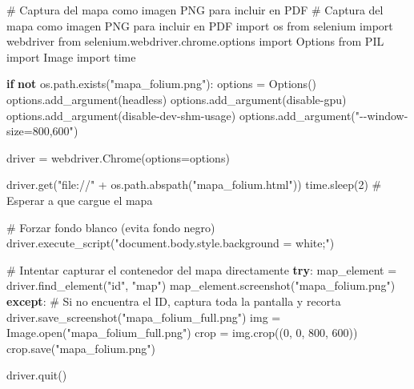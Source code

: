 \documentclass[
  letterpaper,
  DIV=11,
  numbers=noendperiod]{scrreprt}
\newenvironment{Shaded}{\begin{snugshade}}{\end{snugshade}}
\newcommand{\BuiltInTok}[1]{\textcolor[rgb]{0.00,0.23,0.31}{#1}}
\newcommand{\CommentTok}[1]{\textcolor[rgb]{0.37,0.37,0.37}{#1}}
\newcommand{\ControlFlowTok}[1]{\textcolor[rgb]{0.00,0.23,0.31}{\textbf{#1}}}
\newcommand{\DecValTok}[1]{\textcolor[rgb]{0.68,0.00,0.00}{#1}}
\newcommand{\ImportTok}[1]{\textcolor[rgb]{0.00,0.46,0.62}{#1}}
\newcommand{\KeywordTok}[1]{\textcolor[rgb]{0.00,0.23,0.31}{\textbf{#1}}}
\newcommand{\NormalTok}[1]{\textcolor[rgb]{0.00,0.23,0.31}{#1}}
\newcommand{\OperatorTok}[1]{\textcolor[rgb]{0.37,0.37,0.37}{#1}}
\newcommand{\StringTok}[1]{\textcolor[rgb]{0.13,0.47,0.30}{#1}}
\begin{document}
\begin{Shaded}
\begin{Highlighting}[]
\CommentTok{\# Captura del mapa como imagen PNG para incluir en PDF}
\CommentTok{\# Captura del mapa como imagen PNG para incluir en PDF}
\ImportTok{import}\NormalTok{ os}
\ImportTok{from}\NormalTok{ selenium }\ImportTok{import}\NormalTok{ webdriver}
\ImportTok{from}\NormalTok{ selenium.webdriver.chrome.options }\ImportTok{import}\NormalTok{ Options}
\ImportTok{from}\NormalTok{ PIL }\ImportTok{import}\NormalTok{ Image}
\ImportTok{import}\NormalTok{ time}

\ControlFlowTok{if} \KeywordTok{not}\NormalTok{ os.path.exists(}\StringTok{"mapa\_folium.png"}\NormalTok{):}
\NormalTok{    options }\OperatorTok{=}\NormalTok{ Options()}
\NormalTok{    options.add\_argument(}\StringTok{\textquotesingle{}{-}{-}headless\textquotesingle{}}\NormalTok{)}
\NormalTok{    options.add\_argument(}\StringTok{\textquotesingle{}{-}{-}disable{-}gpu\textquotesingle{}}\NormalTok{)}
\NormalTok{    options.add\_argument(}\StringTok{\textquotesingle{}{-}{-}disable{-}dev{-}shm{-}usage\textquotesingle{}}\NormalTok{)}
\NormalTok{    options.add\_argument(}\StringTok{"{-}{-}window{-}size=800,600"}\NormalTok{)}

\NormalTok{    driver }\OperatorTok{=}\NormalTok{ webdriver.Chrome(options}\OperatorTok{=}\NormalTok{options)}

\NormalTok{    driver.get(}\StringTok{"file://"} \OperatorTok{+}\NormalTok{ os.path.abspath(}\StringTok{"mapa\_folium.html"}\NormalTok{))}
\NormalTok{    time.sleep(}\DecValTok{2}\NormalTok{)  }\CommentTok{\# Esperar a que cargue el mapa}

    \CommentTok{\# Forzar fondo blanco (evita fondo negro)}
\NormalTok{    driver.execute\_script(}\StringTok{"document.body.style.background = \textquotesingle{}white\textquotesingle{};"}\NormalTok{)}

    \CommentTok{\# Intentar capturar el contenedor del mapa directamente}
    \ControlFlowTok{try}\NormalTok{:}
\NormalTok{        map\_element }\OperatorTok{=}\NormalTok{ driver.find\_element(}\StringTok{"id"}\NormalTok{, }\StringTok{"map"}\NormalTok{)}
\NormalTok{        map\_element.screenshot(}\StringTok{"mapa\_folium.png"}\NormalTok{)}
    \ControlFlowTok{except}\NormalTok{:}
        \CommentTok{\# Si no encuentra el ID, captura toda la pantalla y recorta}
\NormalTok{        driver.save\_screenshot(}\StringTok{"mapa\_folium\_full.png"}\NormalTok{)}
\NormalTok{        img }\OperatorTok{=}\NormalTok{ Image.}\BuiltInTok{open}\NormalTok{(}\StringTok{"mapa\_folium\_full.png"}\NormalTok{)}
\NormalTok{        crop }\OperatorTok{=}\NormalTok{ img.crop((}\DecValTok{0}\NormalTok{, }\DecValTok{0}\NormalTok{, }\DecValTok{800}\NormalTok{, }\DecValTok{600}\NormalTok{))}
\NormalTok{        crop.save(}\StringTok{"mapa\_folium.png"}\NormalTok{)}

\NormalTok{    driver.quit()}
\end{Highlighting}
\end{Shaded}
\end{document}
